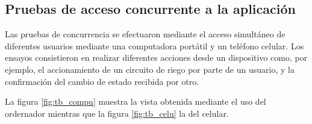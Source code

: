\subsection{Pruebas de acceso concurrente a la aplicación}
\label{sec:Pruebas de acceso concurrente a la aplicación}



Las pruebas de concurrencia se efectuaron mediante el acceso simultáneo de diferentes usuarios mediante una computadora portátil y un teléfono celular. Los ensayos consistieron en realizar diferentes acciones desde un dispositivo como, por ejemplo, el accionamiento de un circuito de riego por parte de un usuario, y la confirmación del cambio de estado recibida por otro. 
 
La figura \ref{fig:tb_compu} muestra la vista obtenida mediante el uso del ordernador mientras que la figura  \ref{fig:tb_celu} la del celular.

